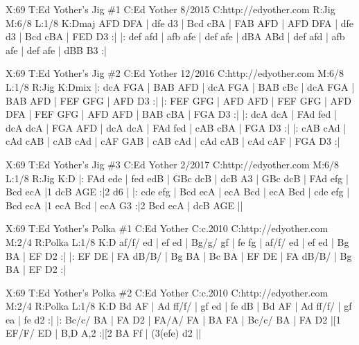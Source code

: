 \documentclass[letterpaper]{article}
\begin{document}
\begin{abc}[name]
X:69
T:Ed Yother's Jig \#1
C:Ed Yother 8/2015
C:http://edyother.com
R:Jig
M:6/8
L:1/8
K:Dmaj
AFD DFA | dfe d3 | Bcd cBA | FAB AFD | 
AFD DFA | dfe d3 | Bcd cBA | FED D3 :|
|: def afd | afb afe | def afe | dBA ABd | 
def afd | afb afe | def afe | dBB B3 :|
\end{abc}

\begin{abc}[name]
X:69
T:Ed Yother's Jig \#2
C:Ed Yother 12/2016
C:http://edyother.com
M:6/8
L:1/8
R:Jig
K:Dmix
|: dcA FGA | BAB AFD | dcA FGA | BAB cBc | 
dcA FGA | BAB AFD | FEF GFG | AFD D3 :|
|: FEF GFG | AFD AFD | FEF GFG | AFD DFA | 
FEF GFG | AFD AFD | BAB cBA | FGA D3 :| 
|: dcA dcA | FAd fed | dcA dcA | FGA AFD | 
dcA dcA | FAd fed | cAB cBA | FGA D3 :|
|: cAB cAd | cAd cAB | cAB cAd | cAF GAB | 
cAB cAd | cAd cAB | cAd cAF | FGA D3 :| 
\end{abc}

\begin{abc}[name]
X:69
T:Ed Yother's Jig \#3
C:Ed Yother 2/2017
C:http://edyother.com
M:6/8
L:1/8
R:Jig
K:D
|: FAd ede | fed edB | GBc dcB | dcB A3 |
GBc dcB | FAd efg | Bcd ecA |1 dcB AGE :|2 d6 | 
|: cde efg | Bcd ecA | ecA Bcd | ecA Bcd | 
cde efg | Bcd ecA |1 ecA Bcd | ecA G3 :|2  Bcd ecA | dcB AGE ||
\end{abc}

\begin{abc}[name]
X:69
T:Ed Yother's Polka \#1
C:Ed Yother
C:c.2010
C:http://edyother.com
M:2/4
R:Polka
L:1/8
K:D
af/f/ ed | ef ed | Bg/g/ gf | fe fg |
af/f/ ed | ef ed | Bg BA | EF D2 :|
|: EF DE | FA dB/B/ | Bg BA | Bc BA |
EF DE | FA dB/B/ | Bg BA | EF D2 :|
\end{abc}

\begin{abc}[name]
X:69
T:Ed Yother's Polka \#2
C:Ed Yother
C:c.2010
C:http://edyother.com
M:2/4
R:Polka
L:1/8
K:D
Bd AF | Ad ff/f/ | gf ed | fe dB |
Bd AF | Ad ff/f/ | gf ea | fe d2 :|
|: Bc/c/ BA | FA D2 | FA/A/ FA | BA FA |
Bc/c/ BA | FA D2 |[1 EF/F/ ED | B,D A,2 :|[2 BA Ff | (3(efe) d2 || 
\end{abc}
\end{document}
